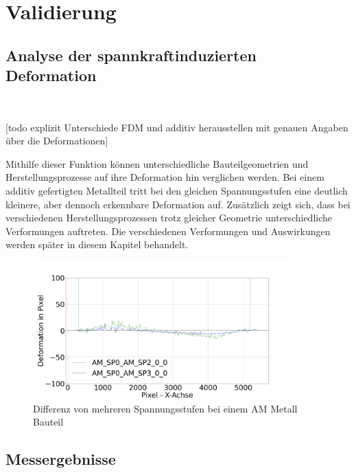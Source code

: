 
\chapter{Validierung}

\section{Analyse der spannkraftinduzierten Deformation}\

[todo explizit Unterschiede FDM und additiv herausstellen mit genauen Angaben über die Deformationen]

Mithilfe dieser Funktion können unterschiedliche Bauteilgeometrien und
Herstellungsprozesse auf ihre Deformation hin verglichen werden.
Bei einem additiv gefertigten Metallteil tritt bei den 
gleichen Spannungsstufen eine deutlich kleinere, 
aber dennoch erkennbare Deformation auf. Zusätzlich zeigt sich, 
dass bei verschiedenen Herstellungsprozessen trotz gleicher 
Geometrie unterschiedliche Verformungen auftreten.
Die verschiedenen Verformungen und Auswirkungen werden später in diesem
Kapitel behandelt.

\begin{figure}[H]
    \centering
    \includegraphics[width=0.9\textwidth]{images/AM_sp0_sp2_defo_plot.png}
    \caption{Differenz von mehreren Spannungsstufen bei einem AM Metall Bauteil}
    \label{fig:deformation_data_am}
\end{figure}

\section{Messergebnisse}

